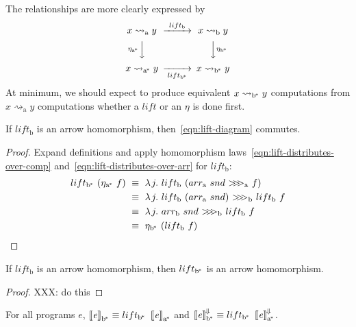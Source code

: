 \documentclass[preprint]{sigplanconf}
\newcommand{\arrow}{\rightsquigarrow}
\newcommand{\conv}{^{\mspace{-2mu}\Downarrow\mspace{-2mu}}}
\newcommand{\meaningofconv}[1]{\left\llbracket{#1}\right\rrbracket\conv}
\newcommand{\arrowlift}{\ensuremath{lift}}
\newcommand{\arrowarr}{\ensuremath{arr}}
\newcommand{\arrowcomp}{\ensuremath{{>}\mspace{-6mu}{>}\mspace{-6mu}{>}}}
\newcommand{\arrowtrans}{\ensuremath{\eta}}
\newcommand{\gen}{_\mathrm{a}}
\newcommand{\genb}{_\mathrm{b}}
\newcommand{\genc}{_\mathrm{a^{\mspace{-2mu}*}}}
\newcommand{\gend}{_\mathrm{b^{\mspace{-2mu}*}}}
\begin{document}
The relationships are more clearly expressed by
\begin{equation}
\begin{CD}
	x \arrow\gen y @>{\arrowlift\genb}>> x \arrow\genb y \\
	@V{\arrowtrans\genc}VV @VV{\arrowtrans\gend}V \\
	x \arrow\genc y @>>{\arrowlift\gend}> x \arrow\gend y
\end{CD}
\label{eqn:lift-diagram}
\end{equation}
At minimum, we should expect to produce equivalent $x \arrow\gend y$ computations from $x \arrow\gen y$ computations whether a $\arrowlift$ or an $\arrowtrans$ is done first.

\begin{theorem}
If $\arrowlift\genb$ is an arrow homomorphism, then~\eqref{eqn:lift-diagram} commutes.
\end{theorem}
\begin{proof}
Expand definitions and apply homomorphism laws~\eqref{eqn:lift-distributes-over-comp} and~\eqref{eqn:lift-distributes-over-arr} for $\arrowlift\genb$:
\begin{align*}
	\arrowlift\gend~(\arrowtrans\genc~f)
	&\ \equiv\ \fun{j}{\arrowlift\genb~(\arrowarr\gen~snd~\arrowcomp\gen~f)}
\\
	&\ \equiv\ \fun{j}{\arrowlift\genb~(\arrowarr\gen~snd)~\arrowcomp\genb~\arrowlift\genb~f}
\\
	&\ \equiv\ \fun{j}{\arrowarr\genb~snd~\arrowcomp\genb~\arrowlift\genb~f}
\\
	&\ \equiv\ \arrowtrans\gend~(\arrowlift\genb~f)
\end{align*}
\end{proof}

\begin{theorem}
If $\arrowlift\genb$ is an arrow homomorphism, then $\arrowlift\gend$ is an arrow homomorphism.
\end{theorem}
\begin{proof}
XXX: do this
\end{proof}

\begin{corollary}
For all programs $\mathit{e}$, $\meaningof{\mathit{e}}\gend \equiv \arrowlift\gend~\meaningof{\mathit{e}}\genc$ and $\meaningofconv{\mathit{e}}\gend \equiv \arrowlift\gend~\meaningofconv{\mathit{e}}\genc$.
\label{cor:astore-semantic-correctness}
\end{corollary}
\end{document}
